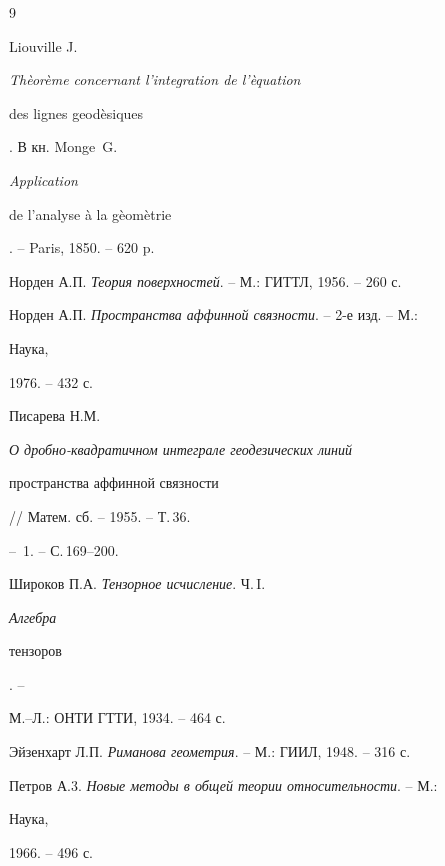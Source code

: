 \begin{thebibliography}{9} 


 




Liouville J. {\em Th\`eor\`eme concernant l'integration de l'\`equation 


des lignes geod\`esiques}. В кн. Monge~G. {\em Application 


de l'analyse \`a la g\`eom\`etrie}. -- Paris, 1850. -- 620 p.




Норден А.П. {\em Теория поверхностей}. -- М.: ГИТТЛ, 1956. -- 260 с.  




Норден А.П. {\em Пространства аффинной связности}. -- 2-е изд. -- М.: 


Наука, 


1976. -- 432 с.  




Писарева Н.М. {\em О дробно-квадратичном интеграле геодезических линий 


пространства аффинной связности} // Матем. сб. -- 1955. -- Т.\,36. 


-- \No\,1. -- С.\,169--200. 




Широков П.А. {\em Тензорное исчисление}. Ч.\,I. {\em Алгебра 


тензоров}. -- 


М.--Л.: ОНТИ ГТТИ, 1934. -- 464 с. 




Эйзенхарт Л.П. {\em Риманова геометрия}. -- М.: ГИИЛ, 1948. -- 316 с.  




Петров А.3. {\em Новые методы в общей теории относительности}. -- М.: 


Наука, 


1966. -- 496 с. 


 


\end{thebibliography} 


 


\vskip 2cm 


 






 


\label{end} 


 


